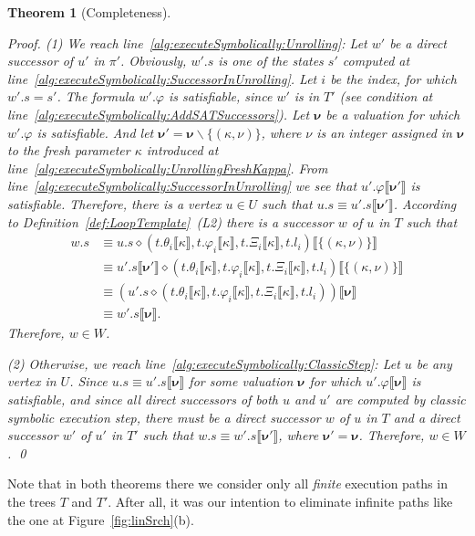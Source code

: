 \documentclass{sig-alternate}%
\newtheorem{thm}{Theorem}%
\newcommand{\prm}[1]{\ensuremath{\llbracket #1 \rrbracket}}
\newcommand{\bld}[1]{\ensuremath{\boldsymbol{#1}}}
\newcommand{\compose}{\ensuremath{\diamond}}
\begin{document}
\begin{thm}[Completeness]
\begin{proof}
(1) We reach line~\ref{alg:executeSymbolically:Unrolling}: Let $w'$ be
a direct successor of $u'$ in $\pi'$. Obviously, $w'.s$ is one of the
states $s'$ computed at
line~\ref{alg:executeSymbolically:SuccessorInUnrolling}. Let $i$ be
the index, for which $w'.s = s'$. The formula $w'.\varphi$ is
satisfiable, since $w'$ is in $T'$ (see condition at
line~\ref{alg:executeSymbolically:AddSATSuccessors}). Let $\bld{\nu}$
be a valuation for which $w'.\varphi$ is satisfiable. And let
$\bld{\nu}' = \bld{\nu} \smallsetminus \{ (\kappa,\nu) \}$, where
$\nu$ is an integer assigned in $\bld{\nu}$ to the fresh parameter
$\kappa$ introduced at
line~\ref{alg:executeSymbolically:UnrollingFreshKappa}. From
line~\ref{alg:executeSymbolically:SuccessorInUnrolling} we see that
$u'.\varphi\prm{\bld{\nu}'}$ is satisfiable. Therefore, there is a
vertex $u \in U$ such that $u.s \equiv u'.s\prm{\bld{\nu}'}$.
According to Definition~\ref{def:LoopTemplate}~(L2) there is a
successor $w$ of $u$ in $T$ such that
\begin{align*}
w.s &\equiv u.s \compose (t.\theta_i\prm{\kappa},
t.\varphi_i\prm{\kappa}, t.\Xi_i\prm{\kappa},
t.l_i)\prm{\{(\kappa,\nu)\}}
\\
&\equiv u'.s\prm{\bld{\nu}'} \compose (t.\theta_i\prm{\kappa},
t.\varphi_i\prm{\kappa}, t.\Xi_i\prm{\kappa},
t.l_i)\prm{\{(\kappa,\nu)\}}
\\
&\equiv (u'.s \compose (t.\theta_i\prm{\kappa}, t.\varphi_i\prm{\kappa},
t.\Xi_i\prm{\kappa}, t.l_i))\prm{\bld{\nu}}
\\
&\equiv w'.s\prm{\bld{\nu}}.
\end{align*}
Therefore, $w \in W$.

(2) Otherwise, we reach
line~\ref{alg:executeSymbolically:ClassicStep}: Let $u$ be any vertex
in $U$. Since $u.s \equiv u'.s\prm{\bld{\nu}}$ for some valuation
$\bld{\nu}$ for which $u'.\varphi\prm{\bld{\nu}}$ is satisfiable, and
since all direct successors of both $u$ and $u'$ are computed by
classic symbolic execution step, there must be a direct successor $w$
of $u$ in $T$ and a direct successor $w'$ of $u'$ in $T'$ such that
$w.s \equiv w'.s\prm{\bld{\nu'}}$, where $\bld{\nu'} = \bld{\nu}$.
Therefore, $w \in W$.
\qed
\end{proof}
\end{thm}

Note that in both theorems there we consider only all \emph{finite}
execution paths in the trees $T$ and $T'$.
After all, it was our intention to eliminate infinite paths like the
one at Figure~\ref{fig:linSrch}(b).
\end{document}
